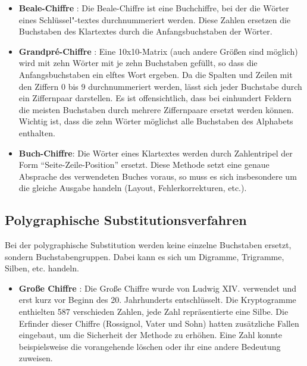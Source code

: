 \begin{refsegment}
\begin{itemize}
\item {\bf Beale-Chiffre} \cite{Singh2001}:
   Die Beale-Chiffre ist eine Buchchiffre, bei der die Wörter eines
   Schlüssel"-textes durchnummeriert werden. Diese Zahlen ersetzen die
   Buchstaben des Klartextes durch die Anfangsbuchstaben der Wörter.

\item {\bf Grandpr\'e-Chiffre} \cite{Savard1999}:
   Eine 10x10-Matrix (auch andere Größen sind möglich) wird mit zehn Wörter
   mit je zehn Buchstaben gefüllt, so dass die Anfangsbuchstaben ein elftes
   Wort ergeben. Da die Spalten und Zeilen mit den Ziffern 0 bis 9
   durchnummeriert werden, lässt sich jeder Buchstabe durch ein Ziffernpaar
   darstellen. Es ist offensichtlich, dass bei einhundert Feldern die meisten
   Buchstaben durch mehrere Ziffernpaare ersetzt werden können. Wichtig ist,
   dass die zehn Wörter möglichst alle Buchstaben des Alphabets enthalten.

\item {\bf Buch-Chiffre}:
   Die Wörter eines Klartextes werden durch Zahlentripel der Form
   "`Seite-Zeile-Position"' ersetzt. Diese Methode setzt eine genaue
   Absprache des verwendeten Buches voraus, so muss es sich insbesondere um
   die gleiche Ausgabe handeln (Layout, Fehlerkorrekturen, etc.).

\end{itemize}



\subsection{Polygraphische Substitutionsverfahren}
\label{polygraphicSubstitutionCiphers}

Bei der polygraphische Substitution werden
keine einzelne Buchstaben ersetzt, sondern Buchstabengruppen. Dabei kann es
sich um Digramme, Trigramme, Silben, etc. handeln.

\begin{itemize}

\item {\bf Große Chiffre} \cite{Singh2001}:
   Die Große Chiffre wurde von Ludwig XIV. verwendet und erst kurz vor
   Beginn des 20. Jahrhunderts entschlüsselt. Die Kryptogramme enthielten 587
   verschieden Zahlen, jede Zahl repräsentierte eine Silbe. Die Erfinder
   dieser Chiffre (Rossignol, Vater und Sohn) hatten zusätzliche Fallen
   eingebaut, um die Sicherheit der Methode zu erhöhen. Eine Zahl konnte
   beispielsweise die vorangehende löschen oder ihr eine andere Bedeutung
   zuweisen.


\end{itemize}
\end{refsegment}
